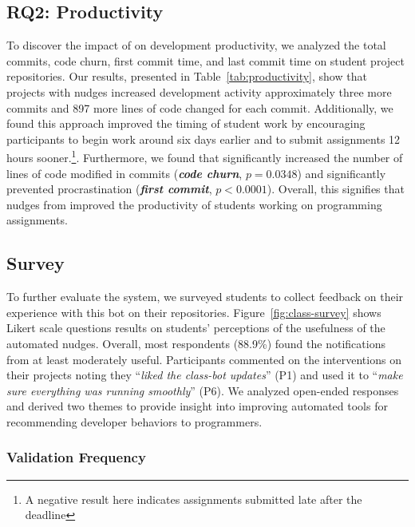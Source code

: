 \subsection{RQ2: Productivity}

To discover the impact of \tooltwo on development productivity, we analyzed the total commits, code churn, first commit time, and last commit time on student project repositories. Our results, presented in Table~\ref{tab:productivity}, show that projects with nudges increased development activity approximately three more commits and 897 more lines of code changed for each commit. Additionally, we found this approach improved the timing of student work by encouraging participants to begin work around six days earlier and to submit assignments 12 hours sooner.\footnote{A negative result here indicates assignments submitted late after the deadline}. Furthermore, we found that \tooltwo significantly increased the number of lines of code modified in commits (\textbf{\em code churn}, $p = 0.0348$) and significantly prevented procrastination (\textbf{\em first commit}, $p < 0.0001$). Overall, this signifies that nudges from \tooltwo improved the productivity of students working on programming assignments.




\subsection{Survey}

To further evaluate the \tooltwo system, we surveyed students to collect feedback on their experience with this bot on their repositories. Figure~\ref{fig:class-survey} shows Likert scale questions results on students' perceptions of the usefulness of the automated nudges. Overall, most respondents (88.9\%) found the notifications from \tooltwo at least moderately useful. Participants commented on the \tooltwo interventions on their projects noting they ``\textit{liked the class-bot updates}'' (P1) and used it to ``\textit{make sure everything was running smoothly}'' (P6). We analyzed open-ended responses and derived two themes to provide insight into improving automated tools for recommending developer behaviors to programmers.




\subsubsection{Validation Frequency}

